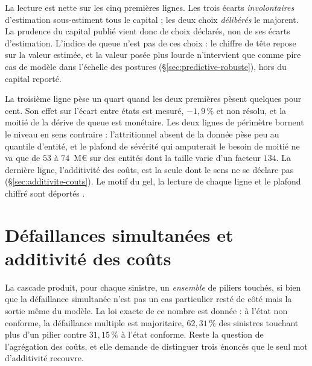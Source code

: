 \vspace{4pt}
\noindent La lecture est nette sur les cinq premières lignes. Les trois écarts
\emph{involontaires} d'estimation sous-estiment tous le capital ; les deux choix
\emph{délibérés} le majorent. La prudence du capital publié vient donc de choix déclarés, non de ses écarts d'estimation.
L'indice de queue n'est
pas de ces choix : le chiffre de tête repose sur la valeur estimée, et la valeur posée
plus lourde n'intervient que comme pire cas de modèle dans l'échelle des postures
(\S\ref{sec:predictive-robuste}), hors du capital reporté.

\vspace{2pt}
\noindent La troisième ligne pèse un quart quand les deux premières pèsent quelques
pour cent. Son effet sur l'écart entre états est mesuré, $-1{,}9\,\%$ et non résolu, et la moitié
de la dérive de queue est monétaire. Les deux lignes de périmètre bornent le niveau en sens
contraire : l'attritionnel absent de la donnée pèse peu au quantile d'entité, et le plafond de
sévérité qui amputerait le besoin de moitié ne va que de $53$ à $74$~M\euro{} sur des entités
dont la taille varie d'un facteur $134$. La dernière ligne, l'additivité des coûts, est la seule
dont le sens ne se déclare pas (\S\ref{sec:additivite-couts}). Le motif du gel, la lecture de
chaque ligne et le plafond chiffré sont déportés \matcomp.

\vspace{2pt}

\section{Défaillances simultanées et additivité des coûts}

La cascade produit, pour chaque sinistre, un \emph{ensemble} de piliers touchés, si bien que la
défaillance simultanée n'est pas un cas particulier resté de côté mais la sortie même du modèle. La
loi exacte de ce nombre est donnée \matcomp : à l'état non conforme, la
défaillance multiple est majoritaire, $62{,}31\,\%$ des sinistres touchant plus d'un
pilier contre $31{,}15\,\%$ à l'état conforme. Reste la question de l'agrégation
des coûts, et elle demande de distinguer trois énoncés que le seul mot d'additivité recouvre.

